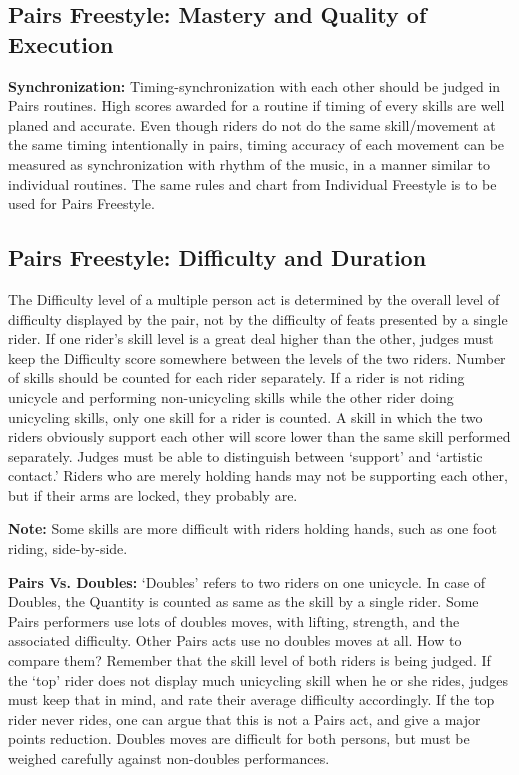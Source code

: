 \subsection{Pairs Freestyle: Mastery and Quality of Execution}
\textbf{Synchronization:} Timing-synchronization with each other should be judged in Pairs routines.
High scores awarded for a routine if timing of every skills are well planed and accurate.
Even though riders do not do the same skill/movement at the same timing intentionally in pairs, timing accuracy of each movement can be measured as synchronization with rhythm of the music, in a manner similar to individual routines.
The same rules and chart from Individual Freestyle is to be used for Pairs Freestyle.

\subsection{Pairs Freestyle: Difficulty and Duration \label{subsec:freestyle_pairs-additional-judging-criteria_difficulty-duration}}
The Difficulty level of a multiple person act is determined by the overall level of difficulty displayed by the pair, not by the difficulty of feats presented by a single rider.
If one rider's skill level is a great deal higher than the other, judges must keep the Difficulty score somewhere between the levels of the two riders.
Number of skills should be counted for each rider separately.
If a rider is not riding unicycle and performing non-unicycling skills while the other rider doing unicycling skills, only one skill for a rider is counted.
A skill in which the two riders obviously support each other will score lower than the same skill performed separately.
Judges must be able to distinguish between ‘support' and ‘artistic contact.' Riders who are merely holding hands may not be supporting each other, but if their arms are locked, they probably are.

\textbf{Note:} Some skills are more difficult with riders holding hands, such as one foot riding, side-by-side.

\textbf{Pairs Vs. Doubles:} `Doubles' refers to two riders on one unicycle.
In case of Doubles, the Quantity is counted as same as the skill by a single rider.
Some Pairs performers use lots of doubles moves, with lifting, strength, and the associated difficulty.
Other Pairs acts use no doubles moves at all.
How to compare them? Remember that the skill level of both riders is being judged.
If the ‘top' rider does not display much unicycling skill when he or she rides, judges must keep that in mind, and rate their average difficulty accordingly.
If the top rider never rides, one can argue that this is not a Pairs act, and give a major points reduction.
Doubles moves are difficult for both persons, but must be weighed carefully against non-doubles performances.

